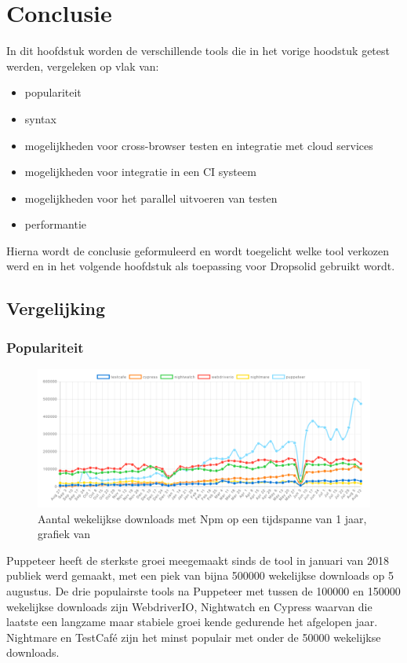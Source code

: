 
\chapter{Conclusie}
\label{ch:conclusie}
In dit hoofdstuk worden de verschillende \glspl{tool} die in het vorige hoodstuk getest werden, vergeleken op vlak van:
\begin{itemize}
\item populariteit
\item syntax
\item mogelijkheden voor cross-browser testen en integratie met cloud services
\item mogelijkheden voor integratie in een \gls{CI} systeem
\item mogelijkheden voor het parallel uitvoeren van testen
\item performantie
\end{itemize}
Hierna wordt de conclusie geformuleerd en wordt toegelicht welke \gls{tool} verkozen werd en in het volgende hoofdstuk als toepassing voor Dropsolid gebruikt wordt.

\clearpage
\section{Vergelijking}
\subsection{Populariteit}
\begin{figure}
\caption{Aantal wekelijkse downloads met Npm op een tijdspanne van 1 jaar, grafiek van \textcite{npmtrends}}
\includegraphics[width=1\textwidth]{img/npm_trends.PNG}
\end{figure}
Puppeteer heeft de sterkste groei meegemaakt sinds de \gls{tool} in januari van 2018 publiek werd gemaakt, met een piek van bijna 500000 wekelijkse downloads op 5 augustus. De drie populairste \glspl{tool} na Puppeteer met tussen de 100000 en 150000 wekelijkse downloads zijn WebdriverIO, Nightwatch en Cypress waarvan die laatste een langzame maar stabiele groei kende gedurende het afgelopen jaar. Nightmare en TestCafé zijn het minst populair met onder de 50000 wekelijkse downloads.

